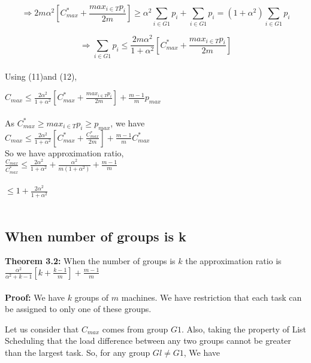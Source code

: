 \documentclass[10pt, conference, compsocconf]{IEEEtran}
\begin{document}
 
\begin{equation}\nonumber
\Rightarrow 2m\alpha^{2}[C_{max}^{*}+ \frac{{max_{i \in T}}{p_{i}}}{2m}] \geq  \alpha^{2} \sum_{i \in G1 }^{}{{p_{i}}} + \sum_{i \in G1 }^{}{{p_{i}}} = (1+\alpha^{2}) \sum_{i \in G1 }^{}{{p_{i}}} \end{equation}

\begin{equation}
\Rightarrow\sum_{i \in G1 }^{}{{p_{i}}} \leq \frac{2m\alpha^{2}}{1+ \alpha^{2}}[C_{max}^{*}+ \frac{{max_{i \in T}}{p_{i}}}{2m}] 
\end{equation}
\\
Using (11)and (12),

 $C_{max} \leq \frac{2\alpha^{2}}{1+ \alpha^{2}}[C_{max}^{*}+ \frac{{max_{i \in T}}{p_{i}}}{2m}]  + {\frac{m-1}{m}} p_{max} $ \\
\\
 As $C_{max}^{*}\geq {{max_{i \in T}}{p_{i}}}\geq p_{max}$, we have\\
 
 $C_{max} \leq \frac{2\alpha^{2}}{1+ \alpha^{2}}[C_{max}^{*}+ \frac{C_{max}^{*}}{2m}] + {\frac{m-1}{m}} C_{max}^{*} $\\
 
 So we have approximation ratio,\\
 $\frac{C_{max}}{C_{max}^{*}} \leq \frac{2\alpha^{2}}{1+\alpha^{2}} + \frac{\alpha^{2}}{m{(1+\alpha^{2})}}  + \frac{m-1}{m}$\\
 \\
$ \leq 1 + \frac{2\alpha^{2}}{1+\alpha^{2}} $\\
\\
\subsection{When number of groups is k}
\textbf{Theorem 3.2:} When the number of groups is $k$ the approximation ratio is $ \frac{\alpha^{2}}{\alpha^{2}+k-1}[k+ {\frac{k-1}{m}} ]+ {\frac{m-1}{m}}    $ \\
\\
\textbf{Proof:} 
  We have $k$ groups of $m$ machines. We have restriction that each task can be assigned to only one of these groups. 

Let us consider  that $ C_{max}$ comes from group  $G1$. Also, taking the property of List Scheduling that the load difference between any two groups cannot be greater than the largest task. So, for any group $Gl \neq G1$, We have\\
\end{document}
